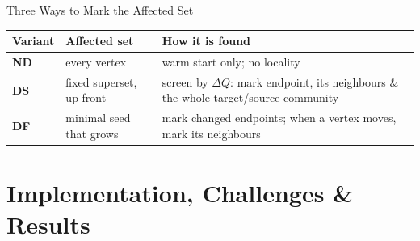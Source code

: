 \documentclass[aspectratio=169]{beamer}
\begin{document}
\begin{frame}{Three Ways to Mark the Affected Set}
    \centering
    \vspace{0.8em}
    \small
    \begin{tabular}{@{}p{1.6cm}p{4.7cm}p{5.6cm}@{}}
        \toprule
        \textbf{Variant} & \textbf{Affected set} & \textbf{How it is found} \\
        \midrule
        \textbf{ND} & every vertex & warm start only; no locality \\[0.5em]
        \textbf{DS} & fixed superset, up front & screen by $\Delta Q$: mark endpoint, its
            neighbours \& the whole target/source community \\[0.5em]
        \textbf{DF} & minimal seed that grows & mark changed endpoints; when a vertex moves,
            mark its neighbours \\
        \bottomrule
    \end{tabular}
\end{frame}

\section{Implementation, Challenges \& Results}
\end{document}
